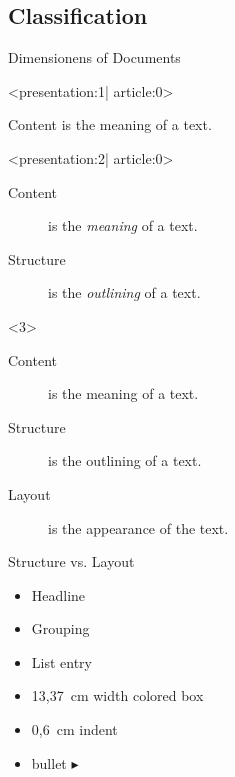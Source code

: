 
\subsection{Classification}

\begin{frame}{Dimensionens of Documents}
  \begin{onlyenv}<presentation:1| article:0>
    \begin{center}
      Content is the meaning of a text.
    \end{center}
  \end{onlyenv}
  \begin{onlyenv}<presentation:2| article:0>
    \begin{description}
      \item[\textnormal{\color{black}Content}] is the \emph{meaning} of a text.
      \item[\textnormal{\color{black}Structure}] is the \emph{outlining} of a text.
    \end{description}
  \end{onlyenv}
  \begin{onlyenv}<3>
    \begin{description}
      \item[Content] is the \alert{meaning} of a text.
      \item[Structure] is the \alert{outlining} of a text.
      \item[Layout] is the \alert{appearance} of the text.
    \end{description}
  \end{onlyenv}
\end{frame}

\begin{frame}{Structure vs. Layout}
  \begin{examples}[Structure]
    \begin{itemize}
      \item Headline
      \item Grouping
      \item List entry
    \end{itemize}
  \end{examples}

  \xxx

  \begin{examples}[Layout]
    \begin{itemize}
      \item 13{,}37~cm width colored box
      \item 0{,}6~cm indent
      \item bullet $\blacktriangleright$
    \end{itemize}
  \end{examples}
\end{frame}

